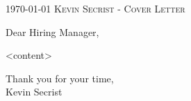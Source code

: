 \documentclass[localFont,alternative,compact]{yaac-another-awesome-cv}
\begin{document}
    \makecvheader
    \makecvfooter
        {\textsc{\today}}
        {\textsc{Kevin Secrist - Cover Letter}}
        {\thepage}

Dear Hiring Manager,

<content>

Thank you for your time,\\
Kevin Secrist
\end{document}
